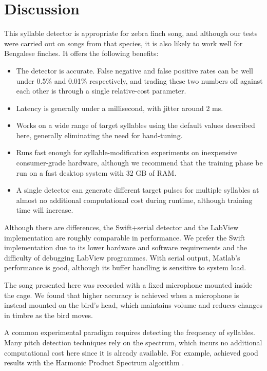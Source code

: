 \documentclass[10pt,letterpaper]{article}
\begin{document}
\section{Discussion}
\label{sec:conclusion}

This syllable detector is appropriate for zebra finch song, and although our tests were carried out on songs from that species, it is also likely to work well for Bengalese finches.  It offers the following benefits:
\begin{itemize}
\item The detector is accurate. False negative and
  false positive rates can be well under 0.5\% and 0.01\% respectively, and trading these two numbers off against each other is through a single relative-cost parameter.
\item Latency is generally under a millisecond, with jitter around 2 ms.
\item Works on a wide range of target syllables using the default values described here, generally eliminating the need for hand-tuning.
\item Runs fast enough for syllable-modification experiments on inexpensive consumer-grade hardware, although we recommend that the training phase be run on a fast desktop system with 32 GB of RAM.
\item A single detector can generate different target pulses for multiple syllables at almost no additional computational cost during runtime, although training time will increase.
\end{itemize}

Although there are differences, the Swift+serial detector and the LabView implementation are roughly comparable in performance.  We prefer the Swift implementation due to its lower hardware and software requirements and the difficulty of debugging LabView programmes.  With serial output, Matlab's performance is good, although its buffer handling is sensitive to system load.

The song presented here was recorded with a fixed microphone mounted inside the cage.  We found that higher accuracy is achieved when a microphone is instead mounted on the bird's head, which maintains volume and reduces changes in timbre as the bird moves.

A common experimental paradigm requires detecting the frequency of syllables.  Many pitch detection techniques rely on the spectrum, which incurs no additional computational cost here since it is already available.  For example, \cite{Canopoli2014} achieved good results with the Harmonic Product Spectrum algorithm \cite{Noll1970}.
\end{document}
